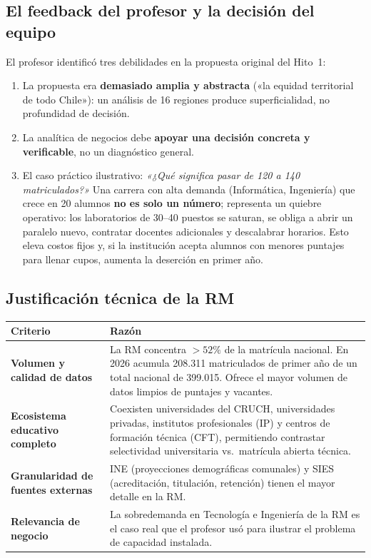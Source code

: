 \documentclass[11pt,a4paper]{article}
\begin{document}
\subsection{El feedback del profesor y la decisión del equipo}

El profesor identificó tres debilidades en la propuesta original del Hito~1:
\begin{enumerate}[leftmargin=*]
    \item La propuesta era \textbf{demasiado amplia y abstracta} («la equidad
          territorial de todo Chile»): un análisis de 16 regiones produce
          superficialidad, no profundidad de decisión.
    \item La analítica de negocios debe \textbf{apoyar una decisión concreta y
          verificable}, no un diagnóstico general.
    \item El caso práctico ilustrativo: \emph{«¿Qué significa pasar de 120 a
          140 matriculados?»} Una carrera con alta demanda (Informática,
          Ingeniería) que crece en 20 alumnos \textbf{no es solo un número};
          representa un quiebre operativo: los laboratorios de 30--40 puestos
          se saturan, se obliga a abrir un paralelo nuevo, contratar docentes
          adicionales y descalabrar horarios. Esto eleva costos fijos y, si la
          institución acepta alumnos con menores puntajes para llenar cupos,
          aumenta la deserción en primer año.
\end{enumerate}

\subsection{Justificación técnica de la RM}

\begin{center}
\small
\begin{tabularx}{\textwidth}{@{}>{\bfseries}p{4.5cm}Y@{}}
\toprule
Criterio & Razón \\
\midrule
Volumen y calidad de datos &
  La RM concentra $>52\%$ de la matrícula nacional. En 2026 acumula
  208.311 matriculados de primer año de un total nacional de 399.015.
  Ofrece el mayor volumen de datos limpios de puntajes y vacantes. \\
Ecosistema educativo completo &
  Coexisten universidades del CRUCH, universidades privadas, institutos
  profesionales (IP) y centros de formación técnica (CFT), permitiendo
  contrastar selectividad universitaria vs.\ matrícula abierta técnica. \\
Granularidad de fuentes externas &
  INE (proyecciones demográficas comunales) y SIES (acreditación,
  titulación, retención) tienen el mayor detalle en la RM. \\
Relevancia de negocio &
  La sobredemanda en Tecnología e Ingeniería de la RM es el caso real
  que el profesor usó para ilustrar el problema de capacidad instalada. \\
\bottomrule
\end{tabularx}
\end{center}
\end{document}
